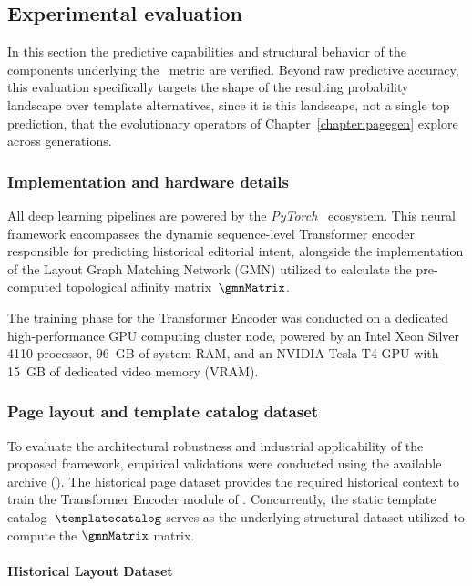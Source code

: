 \subsection{Experimental evaluation}
\label{sec:gwes-evaluation}

In this section the predictive capabilities and structural behavior of the components underlying the \neuralmethod\ metric are verified. Beyond raw predictive accuracy, this evaluation specifically targets the shape of the resulting probability landscape over template alternatives, since it is this landscape, not a single top prediction, that the evolutionary operators of Chapter~\ref{chapter:pagegen} explore across generations.

\subsubsection{Implementation and hardware details}
\label{sec:gwes-implementation}

All deep learning pipelines are powered by the \textit{PyTorch}~\cite{pytorch} ecosystem. This neural framework encompasses the dynamic sequence-level Transformer encoder responsible for predicting historical editorial intent, alongside the implementation of the Layout Graph Matching Network (GMN) utilized to calculate the pre-computed topological affinity matrix~$\gmnMatrix$.

The  training phase for the Transformer Encoder was conducted on a dedicated high-performance GPU computing cluster node, powered by an Intel Xeon Silver 4110 processor, 96~GB of system RAM, and an NVIDIA Tesla T4 GPU with 15~GB of dedicated video memory (VRAM).

\subsubsection{Page layout and template catalog dataset}

To evaluate the architectural robustness and industrial applicability of the proposed framework, empirical validations were conducted using the available \laprovence archive (). The historical page dataset  provides the required historical context to train the Transformer Encoder module of \neuralmethod. Concurrently, the static template catalog~$\templatecatalog$ serves as the underlying structural dataset utilized to compute the $\gmnMatrix$ matrix.

\paragraph{Historical Layout Dataset}

